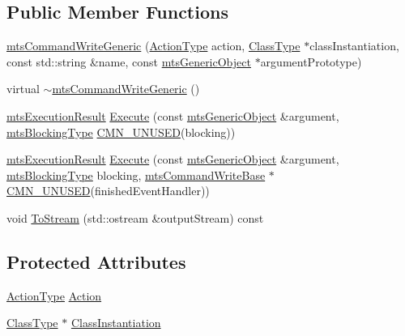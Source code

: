 \subsection*{Public Member Functions}
\begin{DoxyCompactItemize}
\item 
\hyperlink{classmts_command_write_generic_a756523d52f33b00d0591f4dc88869059}{mts\+Command\+Write\+Generic} (\hyperlink{classmts_command_write_generic_aa941087c4b92213fe1b6b670f4ce5a36}{Action\+Type} action, \hyperlink{classmts_command_write_generic_ab4ffe009b7558cff08d309ba7dfb1235}{Class\+Type} $\ast$class\+Instantiation, const std\+::string \&name, const \hyperlink{classmts_generic_object}{mts\+Generic\+Object} $\ast$argument\+Prototype)
\item 
virtual \hyperlink{classmts_command_write_generic_a83dcabde23ba9c1f67af37643ebb4638}{$\sim$mts\+Command\+Write\+Generic} ()
\item 
\hyperlink{classmts_execution_result}{mts\+Execution\+Result} \hyperlink{classmts_command_write_generic_a00ebcfefb63ba9751f70bacb93d77cd6}{Execute} (const \hyperlink{classmts_generic_object}{mts\+Generic\+Object} \&argument, \hyperlink{mts_forward_declarations_8h_ad7426ccb6c883bc780d0ee197dddcbe7}{mts\+Blocking\+Type} \hyperlink{cmn_portability_8h_a021894e2626935fa2305434b1e893ff6}{C\+M\+N\+\_\+\+U\+N\+U\+S\+E\+D}(blocking))
\item 
\hyperlink{classmts_execution_result}{mts\+Execution\+Result} \hyperlink{classmts_command_write_generic_a7cfd8681dcf0ee2effc60c5c1f61c5c3}{Execute} (const \hyperlink{classmts_generic_object}{mts\+Generic\+Object} \&argument, \hyperlink{mts_forward_declarations_8h_ad7426ccb6c883bc780d0ee197dddcbe7}{mts\+Blocking\+Type} blocking, \hyperlink{classmts_command_write_base}{mts\+Command\+Write\+Base} $\ast$\hyperlink{cmn_portability_8h_a021894e2626935fa2305434b1e893ff6}{C\+M\+N\+\_\+\+U\+N\+U\+S\+E\+D}(finished\+Event\+Handler))
\item 
void \hyperlink{classmts_command_write_generic_aac58e354ab9ce4e1e088bb3089093521}{To\+Stream} (std\+::ostream \&output\+Stream) const 
\end{DoxyCompactItemize}
\subsection*{Protected Attributes}
\begin{DoxyCompactItemize}
\item 
\hyperlink{classmts_command_write_generic_aa941087c4b92213fe1b6b670f4ce5a36}{Action\+Type} \hyperlink{classmts_command_write_generic_ac0a7ab9bf5bf14479f46d2f32a259de6}{Action}
\item 
\hyperlink{classmts_command_write_generic_ab4ffe009b7558cff08d309ba7dfb1235}{Class\+Type} $\ast$ \hyperlink{classmts_command_write_generic_a9417d03cc4cc313622021ba6a94f1994}{Class\+Instantiation}
\end{DoxyCompactItemize}
